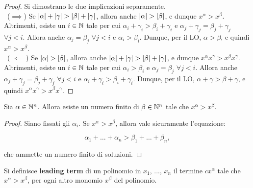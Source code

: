 \documentclass[11pt]{scrbook}
\begin{document}
\begin{proof}
    Si dimostrano le due implicazioni separamente. \\
    
    \ ($\implies$)\; Se $\left|\alpha\right| + \left|\gamma\right| > \left|\beta\right| + \left|\gamma\right|$, allora
    anche $\left|\alpha\right| > \left|\beta\right|$, e dunque
    $x^\alpha > x^\beta$. Altrimenti, esiste un $i \in \mathbb N$ tale
    per cui $\alpha_i + \gamma_i > \beta_i + \gamma_i$ e $\alpha_j + \gamma_j
    = \beta_j + \gamma_j$ $\forall j < i$. Allora
    anche $\alpha_j = \beta_j$ $\forall j < i$ e
    $\alpha_i > \beta_i$. Dunque, per il LO, $\alpha
    > \beta$, e quindi $x^\alpha > x^\beta$. \\
    
    \ ($\,\,\Longleftarrow\,\;$)\; Se $\left|\alpha\right| > \left|\beta\right|$, allora
    anche $\left|\alpha\right| + \left|\gamma\right| > \left|\beta\right| + \left|\gamma\right|$, e dunque
    $x^\alpha x^\gamma > x^\beta x^\gamma$. Altrimenti, esiste un $i \in \mathbb N$ tale
    per cui $\alpha_i > \beta_i$ e $\alpha_j = \beta_j$ $\forall j < i$. Allora
    anche $\alpha_j + \gamma_j = \beta_j + \gamma_j$ $\forall j < i$ e
    $\alpha_i + \gamma_i > \beta_i + \gamma_i$. Dunque, per il LO, $\alpha + \gamma
    > \beta + \gamma$, e quindi $x^\alpha x^\gamma > x^\beta x^\gamma$.
\end{proof}

\begin{proposition}
    \label{prop:numero_finito_soluzioni_deglex}

    Sia $\alpha \in \mathbb N^n$. Allora esiste un numero finito di $\beta \in \mathbb N^n$
    tale che $x^\alpha > x^\beta$.
\end{proposition}

\begin{proof}
    Siano fissati gli $\alpha_i$. Se $x^\alpha > x^\beta$,
    allora vale sicuramente l'equazione:
    
    \[ \alpha_1 + \ldots + \alpha_n > \beta_1 + \ldots + \beta_n, \]
    
    \vskip 0.1in
    
    che ammette un numero finito di soluzioni.
\end{proof}

\begin{definition}
    Si definisce \textbf{leading term} di un polinomio in
    $x_1$, ..., $x_n$ il termine $cx^\alpha$ tale che
    $x^\alpha > x^\beta$, per ogni altro monomio $x^\beta$
    del polinomio.
\end{definition}
\end{document}

